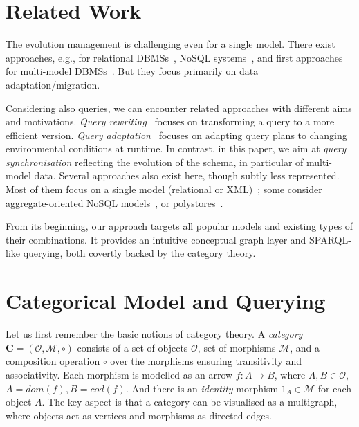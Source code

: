 \section{Related Work}
The evolution management is challenging even for a single model. There exist approaches, e.g., for relational DBMSs~\citep{spivak2015relational}, NoSQL systems~\citep{storl2022darwin}, 
and first approaches for multi-model DBMSs~\citep{cikm_2022}. But they focus primarily on data adaptation/migration.

Considering also queries, we can encounter related approaches with different aims and motivations. \textit{Query rewriting}~\citep{10.1007/s00778-021-00676-3} focuses on transforming a query to a more efficient version.
\textit{Query adaptation}~\citep{10.5555/1331939.1331940} focuses on adapting query plans to changing environmental conditions at runtime. In contrast, in this paper, we aim at \textit{query synchronisation} reflecting the evolution of the schema, in particular of multi-model data. Several approaches also exist here, though subtly less represented. Most of them focus on a single model (relational or XML)~\citep{10.14778/1921071.1921078}; some consider aggregate-oriented NoSQL models~\citep{DBLP:conf/er/MollerKHS19}, or polystores~\citep{9252014}.

From its beginning, our approach targets all popular models and existing types of their combinations. It provides an intuitive conceptual graph layer and SPARQL-like querying, both covertly backed by the category theory.


\section{Categorical Model and Querying}


Let us first remember the basic notions of category theory.
A \textit{category} $\mathbf{C} = (\mathcal{O}, \mathcal{M}, \circ)$ consists of a set of objects $\mathcal{O}$, set of morphisms $\mathcal{M}$, and a composition operation $\circ$ over the morphisms ensuring transitivity and associativity. Each morphism is modelled as an arrow $f : A \rightarrow B$, where $A, B \in \mathcal{O}$, $A = \textit{dom}(f), B = \textit{cod}(f)$. And there is an \textit{identity} morphism $1_A \in \mathcal{M}$ for each object $A$.
The key aspect is that a category can be visualised as a multigraph, where objects act as vertices and morphisms as directed edges.


